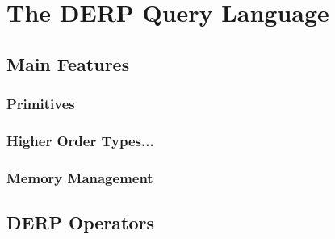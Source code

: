 \documentclass{article}
\begin{document}
\newpage
\section{\textbf{The DERP Query Language}}
\subsection{Main Features}
\subsubsection{Primitives}
\subsubsection{Higher Order Types...}
\subsubsection{Memory Management}
\subsection{DERP Operators}
\end{document}
